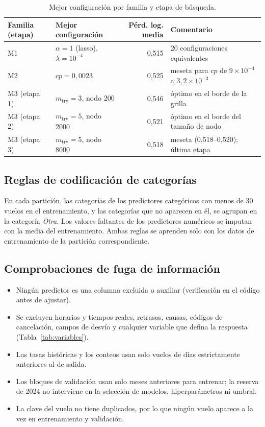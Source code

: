 \documentclass[11pt,a4paper]{article}
\begin{document}
\begin{table}[ht]
\centering\small
\begin{tabular}{llrl}
\toprule
Familia (etapa) & Mejor configuración & Pérd. log. media & Comentario\\
\midrule
M1 & $\alpha=1$ (lasso), $\lambda=10^{-4}$ & 0,515 & 20 configuraciones equivalentes\\
M2 & $cp=0{,}0023$ & 0,525 & meseta para $cp$ de $9\times10^{-4}$ a $3{,}2\times10^{-3}$\\
M3 (etapa 1) & $m_{\text{try}}=3$, nodo 200 & 0,546 & óptimo en el borde de la grilla\\
M3 (etapa 2) & $m_{\text{try}}=5$, nodo 2000 & 0,521 & óptimo en el borde del tamaño de nodo\\
M3 (etapa 3) & $m_{\text{try}}=5$, nodo 8000 & 0,518 & meseta (0,518--0,520); última etapa\\
\bottomrule
\end{tabular}
\caption{Mejor configuración por familia y etapa de búsqueda.}
\label{tab:busqueda}
\end{table}
 
\subsection{Reglas de codificación de categorías}
En cada partición, las categorías de los predictores categóricos con menos de 30 vuelos en el entrenamiento, y las categorías que no aparecen en él, se agrupan en la categoría \emph{Otra}. Los valores faltantes de los predictores numéricos se imputan con la media del entrenamiento. Ambas reglas se aprenden solo con los datos de entrenamiento de la partición correspondiente.
 
\subsection{Comprobaciones de fuga de información}
\begin{itemize}[leftmargin=*]
  \item Ningún predictor es una columna excluida o auxiliar (verificación en el código antes de ajustar).
  \item Se excluyen horarios y tiempos reales, retrasos, causas, códigos de cancelación, campos de desvío y cualquier variable que defina la respuesta (Tabla~\ref{tab:variables}).
  \item Las tasas históricas y los conteos usan solo vuelos de días estrictamente anteriores al de salida.
  \item Los bloques de validación usan solo meses anteriores para entrenar; la reserva de 2024 no interviene en la selección de modelos, hiperparámetros ni umbral.
  \item La clave del vuelo no tiene duplicados, por lo que ningún vuelo aparece a la vez en entrenamiento y validación.
\end{itemize}
 
\end{document}
